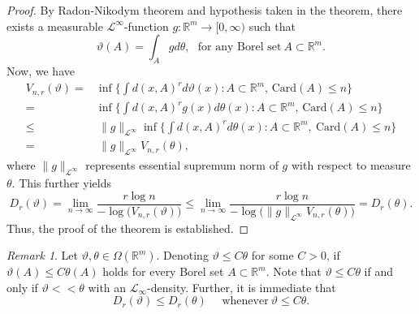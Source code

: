 \documentclass{amsproc}
\theoremstyle{definition}
\theoremstyle{remark}
\newtheorem{remark}[theorem]{Remark}
\numberwithin{equation}{section}
\begin{document}
\begin{proof}
By Radon-Nikodym theorem and hypothesis taken in the theorem, there exists a measurable $\mathcal{L}^{\infty}$-function $g: \mathbb{R}^m \to [0, \infty) $ such that $$ \vartheta(A)= \int_A g d\theta,~~~\text{for any Borel set}~A \subset \mathbb{R}^m.$$
Now, we have
\begin{equation*}
 \begin{aligned}
 V_{n,r}(\vartheta)= & \inf \Big\{\int d(x, A)^r d\vartheta(x): A \subset \mathbb{R}^m, \, \text{Card}(A) \le n\Big\}\\ = &\inf \Big\{\int d(x, A)^r g(x) d\theta(x): A \subset \mathbb{R}^m, \, \text{Card}(A) \le n\Big\} \\ \le & ~\|g\|_{\mathcal{L}^{\infty}} \inf \Big\{\int d(x, A)^rd\theta(x) : A \subset \mathbb{R}^m, ~ \text{Card}(A) \le n\Big\} \\   = & ~ \|g\|_{\mathcal{L}^{\infty}} V_{n,r}(\theta),
 \end{aligned}
 \end{equation*}
 where $\|g\|_{\mathcal{L}^{\infty}}$ represents essential supremum norm of $g$ with respect to measure $\theta.$ 
 This further yields
  $$D_r(\vartheta)= \lim_{n \to \infty} \frac{r \log n}{- \log \big(V_{n,r}(\vartheta)\big)} \le \lim_{n \to \infty} \frac{r \log n}{- \log \big(\|g\|_{\mathcal{L}^{\infty}}V_{n,r}(\theta)\big)} = D_r(\theta).$$
  Thus, the proof of the theorem is established.
\end{proof}

\begin{remark}\label{Remuse1}
Let $\vartheta, \theta \in \Omega(\mathbb{R}^m).$ Denoting $\vartheta \le C \theta$ for some $C>0$, if $\vartheta(A) \le C \theta(A)$ holds for every Borel set $A \subset \mathbb{R}^m.$
Note that $\vartheta \le C \theta $ if and only if $\vartheta << \theta$ with an $\mathcal{L}_{\infty}$-density. Further, it is immediate that $$ D_r(\vartheta) \le D_r(\theta)~~ ~~~~\text{whenever}~ \vartheta \le C \theta.$$
\end{remark}
\end{document}
